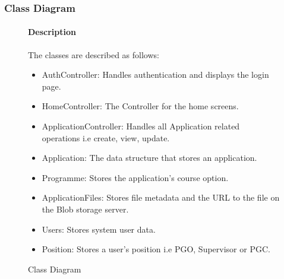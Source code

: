 \documentclass[11pt]{article}
\begin{document}
\subsubsection{Class Diagram}
\begin{figure}[H]
	\caption{Class Diagram}
	
\paragraph{Description}
The classes are described as follows:
\begin{itemize}
	\item AuthController: Handles authentication and displays the login page.
	\item HomeController: The Controller for the home screens.
	\item ApplicationController: Handles all Application related operations i.e create, view, update.
	\item Application: The data structure that stores an application.
	\item Programme: Stores the application's course option.
	\item ApplicationFiles: Stores file metadata and the URL to the file on the Blob storage server.
	\item Users: Stores system user data.
	\item Position: Stores a user's position i.e PGO, Supervisor or PGC.
\end{itemize}
\end{figure}
\end{document}

